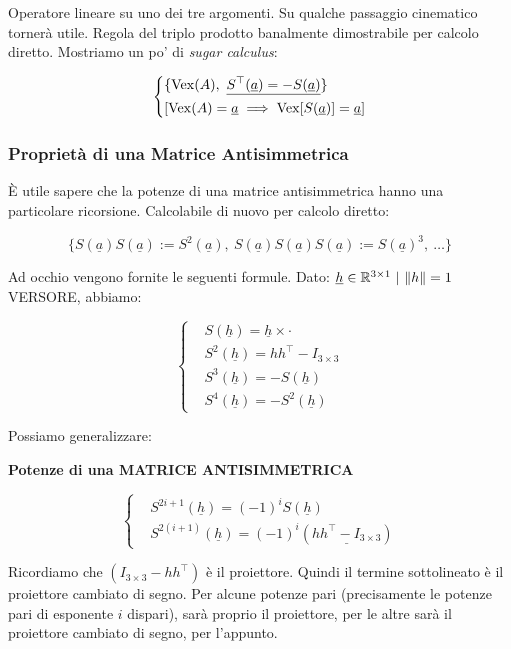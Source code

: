 Operatore lineare su uno dei tre argomenti. Su qualche passaggio cinematico tornerà utile. Regola del triplo prodotto banalmente dimostrabile per calcolo diretto. Mostriamo un po' di \emph{sugar calculus}:

\[
	\left\{
	\begin{aligned}
	&\{\operatorname{Vex}(A),\ \underline{S^\top(\underline{a}) = -S(\underline{a})}\}\\
	&[\operatorname{Vex}(A)=\underline{a} \implies \operatorname{Vex}[S(\underline{a})] = \underline{a}]
	\end{aligned}
	\right.
\]

\subsubsection{Proprietà di una Matrice Antisimmetrica}

\`E utile sapere che la potenze di una matrice antisimmetrica hanno una particolare ricorsione. Calcolabile di nuovo per calcolo diretto:

\[	
	\{S(\underline{a})S(\underline{a}) := S^2(\underline{a}),\ S(\underline{a})S(\underline{a})S(\underline{a}) := S(\underline{a})^3,\ \dots\}
\]

Ad occhio vengono fornite le seguenti formule. Dato: $\underline{h}\in\R^{3\times 1}\ |\ \norma{h}=1$ VERSORE, abbiamo:

\[
	\left\{
	\begin{aligned}
	&S(\underline{h}) = \underline{h}\times\mathord{\cdot}\\
	&S^2(\underline{h}) = hh^\top - I_{3\times 3}\\
	&S^3(\underline{h}) = -S(\underline{h})\\
	&S^4(\underline{h}) = -S^2(\underline{h})
	\end{aligned}
	\right.
\]

Possiamo generalizzare:

\begin{thrm}{\textbf{Potenze di una MATRICE ANTISIMMETRICA}}

\[
	\left\{
	\begin{aligned}
	&S^{2i+1}(\underline{h}) = (-1)^iS(\underline{h})\\
	&S^{2(i+1)}(\underline{h}) = (-1)^i(\underline{hh^\top -I_{3\times 3}})
	\end{aligned}
	\right.
\]

\end{thrm}

Ricordiamo che $(I_{3\times 3} - hh^\top)$ è il proiettore. Quindi il termine sottolineato è il proiettore cambiato di segno. Per alcune potenze pari (precisamente le potenze pari di esponente $i$ dispari), sarà proprio il proiettore, per le altre sarà il proiettore cambiato di segno, per l'appunto.

